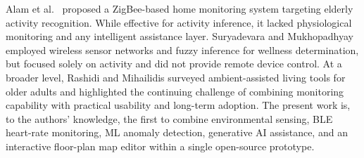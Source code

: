 Alam et al.\ \cite{Alam2012} proposed a ZigBee-based home monitoring system targeting elderly activity recognition. While effective for activity inference, it lacked physiological monitoring and any intelligent assistance layer. Suryadevara and Mukhopadhyay \cite{Suryadevara2014} employed wireless sensor networks and fuzzy inference for wellness determination, but focused solely on activity and did not provide remote device control. At a broader level, Rashidi and Mihailidis \cite{Rashidi2013} surveyed ambient-assisted living tools for older adults and highlighted the continuing challenge of combining monitoring capability with practical usability and long-term adoption. The present work is, to the authors' knowledge, the first to combine environmental sensing, BLE heart-rate monitoring, ML anomaly detection, generative AI assistance, and an interactive floor-plan map editor within a single open-source prototype.